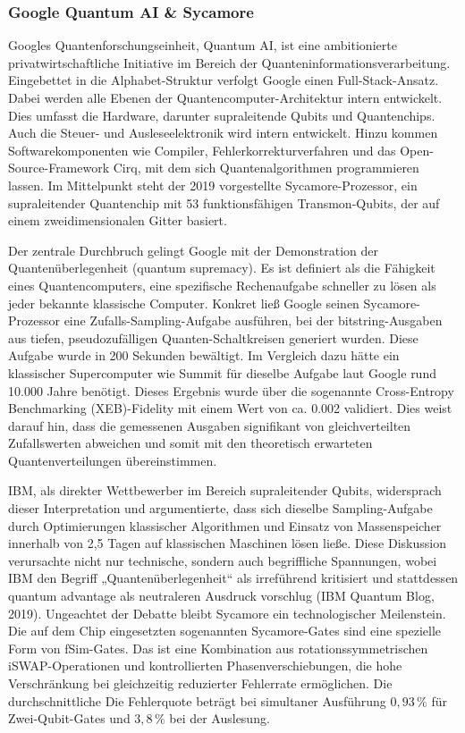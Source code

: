 \subsubsection*{Google Quantum AI & Sycamore} 

Googles Quantenforschungseinheit, Quantum AI, ist eine ambitionierte privatwirtschaftliche Initiative im Bereich der Quanteninformationsverarbeitung.  Eingebettet in die Alphabet-Struktur verfolgt Google einen Full-Stack-Ansatz. Dabei werden alle Ebenen der Quantencomputer-Architektur intern entwickelt. Dies umfasst die Hardware, darunter supraleitende Qubits und Quantenchips. Auch die Steuer- und Ausleseelektronik wird intern entwickelt. Hinzu kommen Softwarekomponenten wie Compiler, Fehlerkorrekturverfahren und das Open-Source-Framework Cirq, mit dem sich Quantenalgorithmen programmieren lassen. Im Mittelpunkt steht der 2019 vorgestellte Sycamore-Prozessor, ein supraleitender Quantenchip mit 53 funktionsfähigen Transmon-Qubits, der auf einem zweidimensionalen Gitter basiert. \cite{aruteQuantumSupremacyUsing2019a}

Der zentrale Durchbruch gelingt Google mit der Demonstration der Quantenüberlegenheit (quantum supremacy). Es ist definiert als die Fähigkeit eines Quantencomputers, eine spezifische Rechenaufgabe schneller zu lösen als jeder bekannte klassische Computer. Konkret ließ Google seinen Sycamore-Prozessor eine Zufalls-Sampling-Aufgabe ausführen, bei der bitstring-Ausgaben aus tiefen, pseudozufälligen Quanten-Schaltkreisen generiert wurden. Diese Aufgabe wurde in 200 Sekunden bewältigt. Im Vergleich dazu hätte ein klassischer Supercomputer wie Summit für dieselbe Aufgabe laut Google rund 10.000 Jahre benötigt. \cite{aruteQuantumSupremacyUsing2019a}
Dieses Ergebnis wurde über die sogenannte Cross-Entropy Benchmarking (XEB)-Fidelity mit einem Wert von ca. 0.002 validiert. \cite{maksudul_shadat_akash_quantum_2025} Dies weist darauf hin, dass die gemessenen Ausgaben signifikant von gleichverteilten Zufallswerten abweichen und somit mit den theoretisch erwarteten Quantenverteilungen übereinstimmen.

IBM, als direkter Wettbewerber im Bereich supraleitender Qubits, widersprach dieser Interpretation und argumentierte, dass sich dieselbe Sampling-Aufgabe durch Optimierungen klassischer Algorithmen und Einsatz von Massenspeicher innerhalb von 2,5 Tagen auf klassischen Maschinen lösen ließe. \cite{pednault_quantum_2019} Diese Diskussion verursachte nicht nur technische, sondern auch begriffliche Spannungen, wobei IBM den Begriff „Quantenüberlegenheit“ als irreführend kritisiert und stattdessen quantum advantage als neutraleren Ausdruck vorschlug (IBM Quantum Blog, 2019). Ungeachtet der Debatte bleibt Sycamore ein technologischer Meilenstein. Die auf dem Chip eingesetzten sogenannten Sycamore-Gates sind eine spezielle Form von fSim-Gates. Das ist eine Kombination aus rotationssymmetrischen iSWAP-Operationen und kontrollierten Phasenverschiebungen, die hohe Verschränkung bei gleichzeitig reduzierter Fehlerrate ermöglichen. \cite{abughanemPhotonicQuantumComputers2024} Die durchschnittliche Die Fehlerquote beträgt bei simultaner Ausführung \(0{,}93\,\%\) für Zwei-Qubit-Gates und \(3{,}8\,\%\) bei der Auslesung. \cite{arute_quantum_2019}

